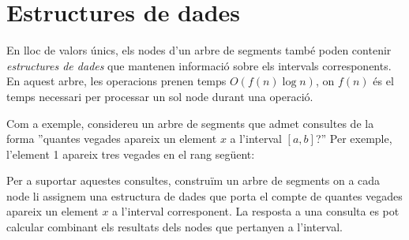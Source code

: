 \section{Estructures de dades}

En lloc de valors únics, els nodes d'un arbre de segments també poden
contenir \emph{estructures de dades} que mantenen informació sobre els
intervals corresponents. En aquest arbre, les operacions prenen temps
$O(f(n) \log n)$, on $f(n)$ és el temps necessari per processar un sol
node durant una operació.

Com a exemple, considereu un arbre de segments que admet consultes de
la forma ''quantes vegades apareix un element $x$ a l'interval
$[a,b]$?'' Per exemple, l'element 1 apareix tres vegades en el rang
següent:


\begin{center}
\end{center}


Per a suportar aquestes consultes, construïm un arbre de segments on a
cada node li assignem una estructura de dades que porta el compte de
quantes vegades apareix un element $x$ a l'interval corresponent. La
resposta a una consulta es pot calcular combinant els resultats dels
nodes que pertanyen a l'interval.

